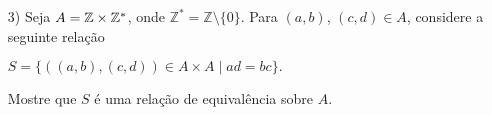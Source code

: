 \documentclass{beamer}
\begin{document}
    \begin{frame}
    \end{frame}
    \begin{frame}
    \end{frame}
    \begin{frame}
        \begin{exemplos}
            \begin{itemize}[label={\arabic*})]                
                \item[3)] Seja $A = \mathbb{Z} \times \mathbb{Z}^*$, onde $\mathbb{Z}^* = \mathbb{Z} \setminus \{0\}$. \pause  Para $(a, b)$, $(c, d) \in A$, \pause considere a seguinte rela{\c c}{\~a}o\pause
                \begin{center}
                    $S = \{((a, b), (c, d)) \in A \times A \mid ad = bc\}.$
                \end{center}
                Mostre que $S$ \'e uma rela{\c c}{\~a}o de equival{\^e}ncia sobre $A$.\pause
            \end{itemize}
        \end{exemplos}
        \vspace{3cm}
    \end{frame}
    \begin{frame}
    \end{frame}
    \begin{frame}
    \end{frame}
    \begin{frame}
    \end{frame}
\end{document}
